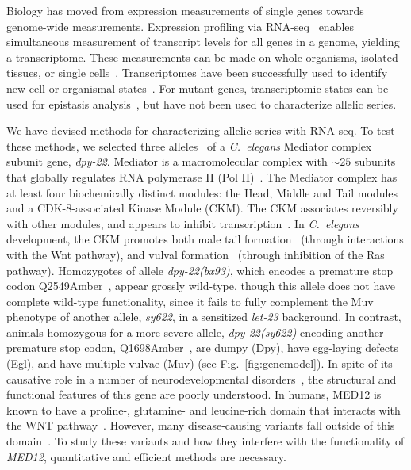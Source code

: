 \documentclass[8pt, twocolumn]{article}
\newcommand{\cel}{\emph{C.~elegans}}
\newcommand{\gene}[1]{\mbox{\emph{#1}}}
\newcommand{\protein}[1]{\mbox{\uppercase{#1}}}
\newcommand{\dpy}[1]{\gene{dpy-22#1}}
\begin{document}
Biology has moved from expression measurements of single genes towards
genome-wide measurements. Expression profiling via RNA-seq~\cite{Mortazavi2008}
enables simultaneous measurement of transcript levels for all genes in a genome,
yielding a transcriptome. These measurements can be made on whole organisms,
isolated tissues, or single cells~\cite{Tang2009,Schwarz2012}. Transcriptomes
have been successfully used to identify new cell or organismal
states~\cite{Angeles-Albores2017,Villani2017}. For mutant genes, transcriptomic
states can be used for epistasis analysis~\cite{Dixit2016,AngelesAlboresHIF},
but have not been used to characterize allelic series.

We have devised methods for characterizing allelic series with RNA-seq. To test
these methods, we selected three alleles~\cite{Zhang2000,Moghal2003} of a \cel{}
Mediator complex subunit gene, \dpy{}. Mediator is a macromolecular complex with
$\sim25$ subunits~\cite{Jeronimo2017} that globally regulates RNA polymerase II
(Pol II)~\cite{Allen2015,Takagi2006}. The Mediator complex has at least four
biochemically distinct modules: the Head, Middle and Tail modules and a
CDK-8-associated Kinase Module (CKM). The CKM associates reversibly with other
modules, and appears to inhibit transcription~\cite{Knuesel2009,Elmlund2006}. In
\cel{} development, the CKM promotes both male tail formation~\cite{Zhang2000}
(through interactions with the Wnt pathway), and vulval
formation~\cite{Moghal2003a} (through inhibition of the Ras pathway).
Homozygotes of allele \gene{dpy-22(bx93)}, which encodes a premature stop codon
Q2549Amber~\cite{Zhang2000}, appear grossly wild-type, though this allele does
not have complete wild-type functionality, since it fails to fully complement
the Muv phenotype of another allele, \emph{sy622}, in a sensitized \emph{let-23}
background. In contrast, animals homozygous for a more severe allele,
\gene{dpy-22(sy622)} encoding another premature stop codon,
Q1698Amber~\cite{Moghal2003}, are dumpy (Dpy), have egg-laying defects (Egl),
and have multiple vulvae (Muv) (see Fig.~\ref{fig:genemodel}). In spite of its
causative role in a number of neurodevelopmental disorders~\cite{Graham2013},
the structural and functional features of this gene are poorly understood. In
humans, \protein{MED12} is known to have a proline-, glutamine- and leucine-rich
domain that interacts with the WNT pathway~\cite{Kim2006}. However, many
disease-causing variants fall outside of this domain~\cite{Yamamoto2015}. To
study these variants and how they interfere with the functionality of
\gene{MED12}, quantitative and efficient methods are necessary.
\end{document}
